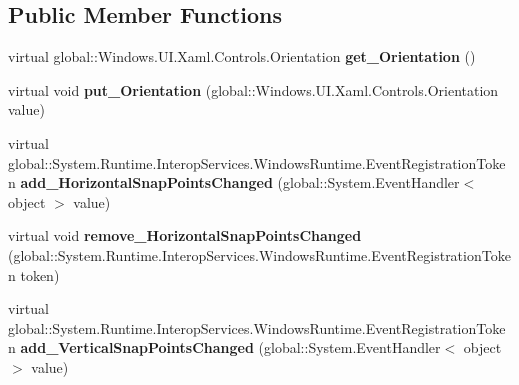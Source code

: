 \subsection*{Public Member Functions}
\begin{DoxyCompactItemize}
\item 
\mbox{\label{class_windows_1_1_u_i_1_1_xaml_1_1_controls_1_1_stack_panel_a9834a2d1432003975ba8a69f4aa789c7}} 
virtual global\+::\+Windows.\+U\+I.\+Xaml.\+Controls.\+Orientation {\bfseries get\+\_\+\+Orientation} ()
\item 
\mbox{\label{class_windows_1_1_u_i_1_1_xaml_1_1_controls_1_1_stack_panel_a99d2c21e5e153b28fba470789fc1748a}} 
virtual void {\bfseries put\+\_\+\+Orientation} (global\+::\+Windows.\+U\+I.\+Xaml.\+Controls.\+Orientation value)
\item 
\mbox{\label{class_windows_1_1_u_i_1_1_xaml_1_1_controls_1_1_stack_panel_a86815ce8db81cb7b06e7beebaa97e788}} 
virtual global\+::\+System.\+Runtime.\+Interop\+Services.\+Windows\+Runtime.\+Event\+Registration\+Token {\bfseries add\+\_\+\+Horizontal\+Snap\+Points\+Changed} (global\+::\+System.\+Event\+Handler$<$ object $>$ value)
\item 
\mbox{\label{class_windows_1_1_u_i_1_1_xaml_1_1_controls_1_1_stack_panel_aabdd867d8e829595aa1cd0066bb43b7c}} 
virtual void {\bfseries remove\+\_\+\+Horizontal\+Snap\+Points\+Changed} (global\+::\+System.\+Runtime.\+Interop\+Services.\+Windows\+Runtime.\+Event\+Registration\+Token token)
\item 
\mbox{\label{class_windows_1_1_u_i_1_1_xaml_1_1_controls_1_1_stack_panel_ad8defe3d3a6f357c9736a835aaf0d633}} 
virtual global\+::\+System.\+Runtime.\+Interop\+Services.\+Windows\+Runtime.\+Event\+Registration\+Token {\bfseries add\+\_\+\+Vertical\+Snap\+Points\+Changed} (global\+::\+System.\+Event\+Handler$<$ object $>$ value)
\item 
\mbox{\label{class_windows_1_1_u_i_1_1_xaml_1_1_controls_1_1_stack_panel_ad941c568cedfbb247496984f450b1857}} 

\end{DoxyCompactItemize}
